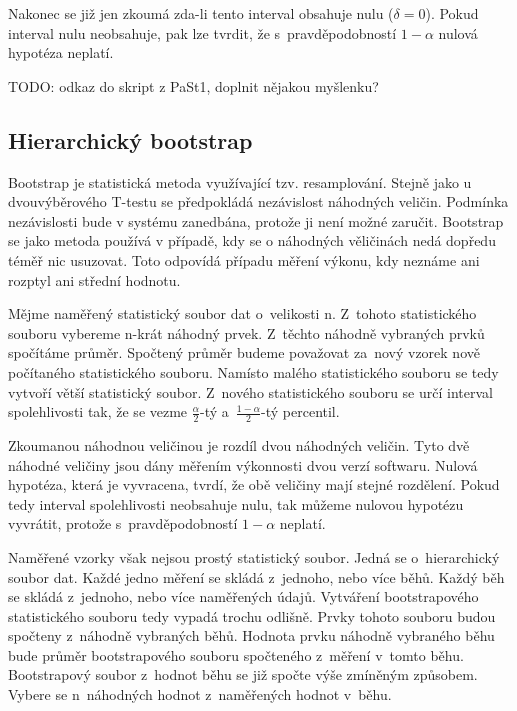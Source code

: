Nakonec se již jen zkoumá zda-li tento interval obsahuje nulu ($\delta = 0$).
Pokud interval nulu neobsahuje, pak lze tvrdit, že s~pravděpodobností $1-\alpha$
nulová hypotéza neplatí.

TODO: odkaz do skript z PaSt1, doplnit nějakou myšlenku? %

\subsection{Hierarchický bootstrap}


Bootstrap je statistická metoda využívající tzv. resamplování.
Stejně jako u dvouvýběrového T-testu se předpokládá nezávislost náhodných veličin.
Podmínka nezávislosti bude v systému zanedbána, protože ji není možné zaručit.
Bootstrap se jako metoda používá v případě, kdy se o náhodných věličinách nedá
dopředu téměř nic usuzovat. Toto odpovídá případu měření výkonu, kdy neznáme ani
rozptyl ani střední hodnotu.

Mějme naměřený statistický soubor dat o~velikosti n.
Z~tohoto statistického souboru vybereme n-krát náhodný prvek. Z~těchto náhodně vybraných prvků spočítáme průměr.
Spočtený průměr budeme považovat za~nový vzorek nově počítaného statistického souboru.
Namísto malého statistického souboru se tedy vytvoří větší statistický soubor.
Z~nového statistického souboru se určí interval spolehlivosti tak, že se vezme $\frac{\alpha}{2}$-tý
a~$\frac{1-\alpha}{2}$-tý percentil.

Zkoumanou náhodnou veličinou je rozdíl dvou náhodných veličin. Tyto dvě náhodné veličiny jsou dány měřením
výkonnosti dvou verzí softwaru. Nulová hypotéza, která je vyvracena, tvrdí, že obě veličiny mají stejné rozdělení.
Pokud tedy interval spolehlivosti neobsahuje nulu, tak můžeme nulovou hypotézu vyvrátit, protože s~pravděpodobností
$1-\alpha$ neplatí.

Naměřené vzorky však nejsou prostý statistický soubor. Jedná se o~hierarchický soubor dat.
Každé jedno měření se skládá z~jednoho, nebo více běhů. Každý běh se skládá z~jednoho, nebo více naměřených údajů.
Vytváření bootstrapového statistického souboru tedy vypadá trochu odlišně. Prvky tohoto souboru
budou spočteny z~náhodně vybraných běhů. Hodnota prvku náhodně vybraného běhu bude průměr
bootstrapového souboru spočteného z~měření v~tomto běhu. Bootstrapový soubor z~hodnot běhu
se již spočte výše zmíněným způsobem. Vybere se n~náhodných hodnot z~naměřených hodnot v~běhu.

